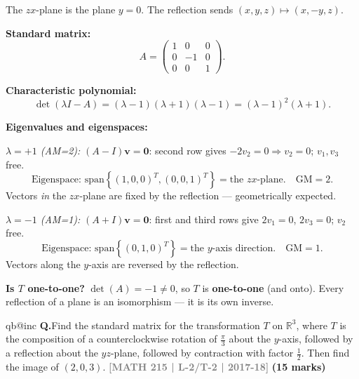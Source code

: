 \documentclass[12pt,a3paper]{article}
\makeatletter
\newcommand{\yr}[1]{\hfill\textcolor{gray}{\small\textbf{[#1]}}}
\newcommand{\mk}[1]{\textcolor{orange!70!black}{\small\textbf{(#1 marks)}}}
\newcounter{qnum}
\newcommand{\Q}[1]{%
  \csname qb@inc\endcsname
  \needspace{4\baselineskip}
  \refstepcounter{qnum}
  \vspace{6pt}
  \noindent\textbf{Q\theqnum.}\enspace #1\par
}
\makeatother
\begin{document}
\begin{tcolorbox}[enhanced,breakable,
  colback=cF!4,colframe=cF,boxrule=0.8pt,arc=5pt,
  title={\textbf{Answer --- Reflection about the $zx$-Plane: Eigenvalues, Eigenvectors, One-to-One?}},
  fonttitle=\bfseries\color{white},colbacktitle=cF]

The $zx$-plane is the plane $y=0$. The reflection sends $(x,y,z)\mapsto(x,-y,z)$.

\textbf{Standard matrix:}
\[
A=\begin{pmatrix}1&0&0\\0&-1&0\\0&0&1\end{pmatrix}.
\]

\textbf{Characteristic polynomial:}
\[
\det(\lambda I-A)=(\lambda-1)(\lambda+1)(\lambda-1)=(\lambda-1)^2(\lambda+1).
\]

\textbf{Eigenvalues and eigenspaces:}

\textit{$\lambda=+1$ (AM=2):}
$(A-I)\mathbf{v}=\mathbf{0}$: second row gives $-2v_2=0\Rightarrow v_2=0$; $v_1,v_3$ free.
\[
\text{Eigenspace: }\mathrm{span}\!\left\{(1,0,0)^T,(0,0,1)^T\right\}=\text{the }zx\text{-plane}.\quad\text{GM}=2.
\]
Vectors \textit{in} the $zx$-plane are fixed by the reflection — geometrically expected. \checkmark

\textit{$\lambda=-1$ (AM=1):}
$(A+I)\mathbf{v}=\mathbf{0}$: first and third rows give $2v_1=0$, $2v_3=0$; $v_2$ free.
\[
\text{Eigenspace: }\mathrm{span}\!\left\{(0,1,0)^T\right\}=\text{the }y\text{-axis direction}.\quad\text{GM}=1.
\]
Vectors along the $y$-axis are reversed by the reflection. \checkmark

\textbf{Is $T$ one-to-one?} $\det(A)=-1\neq0$, so $T$ is \textbf{one-to-one} (and onto). Every reflection of a plane is an isomorphism — it is its own inverse.

\end{tcolorbox}


\Q{Find the standard matrix for the transformation $T$ on $\mathbb{R}^3$, where $T$ is the composition of a counterclockwise rotation of $\frac{\pi}{3}$ about the $y$-axis, followed by a reflection about the $yz$-plane, followed by contraction with factor $\frac{1}{2}$. Then find the image of $(2,0,3)$.
\yr{MATH 215 | L-2/T-2 | 2017-18} \mk{15}}
\end{document}

